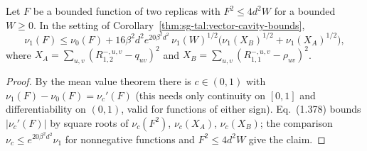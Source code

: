 \begin{theorem}\label{thm:sg-tal:vector-overlap-step}
\leanok
{}
Let $F$ be a bounded function of two replicas with $F^2\le4d^2W$ for a bounded $W\ge0$. In the setting of Corollary~\ref{thm:sg-tal:vector-cavity-bounds},
\[
\nu_1(F)\le\nu_0(F)+16\beta^2d^2e^{20\beta^2d^2}\,\nu_1(W)^{1/2}\bigl(\nu_1(X_B)^{1/2}+\nu_1(X_A)^{1/2}\bigr),
\]
where $X_A=\sum_{u,v}(R^{-,u,v}_{1,2}-q_{uv})^2$ and $X_B=\sum_{u,v}(R^{-,u,v}_{1,1}-\rho_{uv})^2$.
\end{theorem}
\begin{proof}
\leanok
By the mean value theorem there is $c\in(0,1)$ with $\nu_1(F)-\nu_0(F)=\nu_c'(F)$ (this needs only continuity on $[0,1]$ and differentiability on $(0,1)$, valid for functions of either sign). Eq.~(1.378) bounds $|\nu_c'(F)|$ by square roots of $\nu_c(F^2)$, $\nu_c(X_A)$, $\nu_c(X_B)$; the comparison $\nu_c\le e^{20\beta^2d^2}\nu_1$ for nonnegative functions and $F^2\le4d^2W$ give the claim.
\end{proof}


